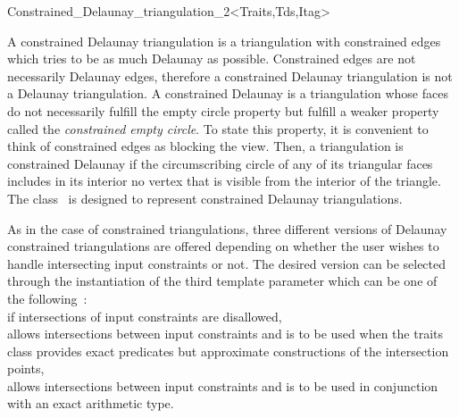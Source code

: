 

\begin{ccRefClass}{Constrained_Delaunay_triangulation_2<Traits,Tds,Itag>}  %


\ccDefinition
A constrained Delaunay triangulation is a triangulation with
constrained edges which tries to be as much Delaunay as possible.
Constrained edges are not necessarily Delaunay edges,
therefore a constrained Delaunay triangulation is not a Delaunay
triangulation. A constrained Delaunay is a triangulation
whose faces do not
necessarily fulfill the empty circle property
but fulfill a weaker property called the
{\em constrained empty circle}.
 To state this property,
it is convenient to think of  constrained
edges as blocking the view. Then, a triangulation is 
constrained Delaunay if
 the circumscribing circle
of any of its triangular faces includes in its interior 
no vertex  that is visible
from the interior of the triangle.  
The class \ccRefName\ is designed to represent
constrained Delaunay triangulations.

As in the case of constrained triangulations, three different versions
of Delaunay constrained triangulations are offered
depending on whether the user wishes to handle
intersecting input constraints or not.
The desired version can  be selected through the instantiation of the
third template parameter  which can be one of the
following~: \\
 if  intersections of
 input constraints are disallowed,\\
 allows intersections between input
constraints
 and is to be used when the traits
class
provides exact predicates but approximate constructions of the
intersection points,\\
 allows intersections between input
constraints
 and is to be used in conjunction
with an exact arithmetic type.



\end{ccRefClass}
